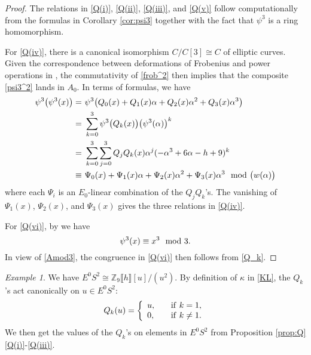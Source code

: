 \documentclass{gtpart}
\theoremstyle{definition}
\theoremstyle{remark}
\newtheorem{ex}[thm]{Example}
\newcommand{\mb}[1]{\mathbb{#1}}
\newcommand{\BZ}{{\mb Z}}
\newcommand{\md}{~~{\rm mod}~}
\newcommand{\A}{\alpha}
\newcommand{\K}{\kappa}
\newcommand{\p}{\psi^3}
\newcommand{\q}[1]{Proposition \ref{prop:Q}\thinspace \eqref{Q(#1)}}
\begin{document}
\begin{proof}
 The relations in \eqref{Q(i)}, \eqref{Q(ii)}, \eqref{Q(iii)}, and 
 \eqref{Q(v)} follow computationally from the formulas in Corollary 
 \ref{cor:psi3} together with the fact that $\p$ is a ring homomorphism.  

 For \eqref{Q(iv)}, there is a canonical isomorphism $C/C[3] \cong C$ of 
 elliptic curves.  Given the correspondence between deformations of 
 Frobenius and power operations in \cite[Theorem B]{cong}, the 
 commutativity of \eqref{frob^2} then implies that the composite 
 \eqref{psi3^2} lands in $A_0$.  In terms of formulas, we have 
 \begin{equation*}
 \begin{split}
  \p \big( \p(x) \big) = & ~ \p \big( Q_0(x) + Q_1(x) \A + Q_2(x) \A^2 + Q_3(x) \A^3 \big) \\
                       = & ~ \sum_{k = 0}^3 \p \big( Q_k(x) \big) \big( \p(\A) \big)^k \\
                       = & ~ \sum_{k = 0}^3 \sum_{j = 0}^3 Q_jQ_k(x) \A^j (-\A^3 + 6 \A - h + 9)^k \\
                  \equiv & ~ \Psi_0(x) + \Psi_1(x) \A + \Psi_2(x) \A^2 + \Psi_3(x) \A^3 \md \big( w(\A) \big) 
 \end{split}
 \end{equation*}
 where each $\Psi_i$ is an $E_0$-linear combination of the $Q_jQ_k$'s.  
 The vanishing of $\Psi_1(x)$, $\Psi_2(x)$, and $\Psi_3(x)$ gives the 
 three relations in \eqref{Q(iv)}.  

 For \eqref{Q(vi)}, by \cite[Propositions 3.25 and 10.5]{cong} we have 
 \[
  \p(x) \equiv x^3 \md 3.  
 \]
 In view of \eqref{Amod3}, the congruence in \eqref{Q(vi)} then follows 
 from \eqref{Q_k}.  
\end{proof}

\begin{ex}
\label{ex}
 We have $E^0 S^2 \cong \BZ_9 \llbracket h \rrbracket [u] / (u^2)$.  By 
 definition of $\K$ in \eqref{KL}, the $Q_k$'s act canonically on 
 $u \in E^0 S^2$: 
 \[
  Q_k(u) = \left\{
  \begin{array}{ll}
    u,  & \quad {\rm if}~k = 1, \\
    0,  & \quad {\rm if}~k \neq 1.  \\
  \end{array}
  \right.
 \]
 We then get the values of the $Q_k$'s on elements in $E^0 S^2$ from 
 \q{i}-\eqref{Q(iii)}.  
\end{ex}
\end{document}
